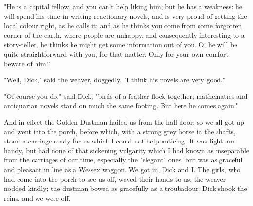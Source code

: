 "He is a capital fellow, and you can't help liking him; but he has a
weakness: he will spend his time in writing reactionary novels, and is
very proud of getting the local colour right, as he calls it; and as he
thinks you come from some forgotten corner of the earth, where people
are unhappy, and consequently interesting to a story-teller, he thinks
he might get some information out of you. O, he will be quite
straightforward with you, for that matter. Only for your own comfort
beware of him!"

"Well, Dick," said the weaver, doggedly, "I think his novels are very
good."

"Of course you do," said Dick; "birds of a feather flock together;
mathematics and antiquarian novels stand on much the same footing. But
here he comes again."

And in effect the Golden Dustman hailed us from the hall-door; so we all
got up and went into the porch, before which, with a strong grey horse
in the shafts, stood a carriage ready for us which I could not help
noticing. It was light and handy, but had none of that sickening
vulgarity which I had known as inseparable from the carriages of our
time, especially the "elegant" ones, but was as graceful and pleasant in
line as a Wessex waggon. We got in, Dick and I. The girls, who had come
into the porch to see us off, waved their hands to us; the weaver nodded
kindly; the dustman bowed as gracefully as a troubadour; Dick shook the
reins, and we were off.
